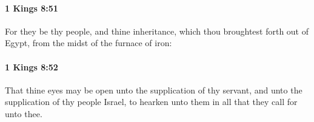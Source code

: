 		\paragraph{1 Kings 8:51} %
			\label{1KINGS-8-51}

			For they be thy people, and thine inheritance, which thou broughtest forth out of Egypt, from the midst of the furnace of iron:


		\paragraph{1 Kings 8:52} %
			\label{1KINGS-8-52}

			That thine eyes may be open unto the supplication of thy servant, and unto the supplication of thy people Israel, to hearken unto them in all that they call for unto thee.


